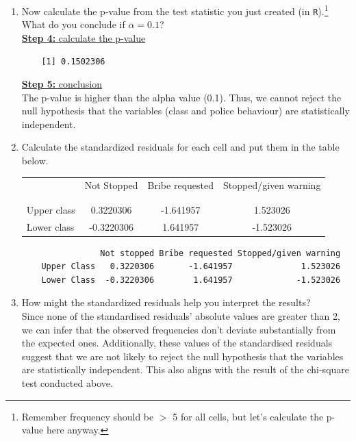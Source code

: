 \documentclass[12pt,letterpaper]{article}
\begin{document}
\begin{enumerate}
	\item [(b)]
	Now calculate the p-value from the test statistic you just created (in \texttt{R}).\footnote{Remember frequency should be $>$ 5 for all cells, but let's calculate the p-value here anyway.}  What do you conclude if $\alpha = 0.1$?\\ [0.3cm]
\underline{\textbf{Step 4:} calculate the p-value} 

\begin{verbatim}
	[1] 0.1502306
\end{verbatim}
\underline{\textbf{Step 5:} conclusion} \\ [0.5cm]
The p-value is higher than the alpha value (0.1). Thus, we cannot reject the null hypothesis that the variables (class and police behaviour) are statistically independent. \\ [0.3cm]
	\item [(c)] Calculate the standardized residuals for each cell and put them in the table below.
	\vspace{1cm}
	
	\begin{table}[h]
		\centering
		\begin{tabular}{l | c c c }
			& Not Stopped & Bribe requested & Stopped/given warning \\
			\\[-1.8ex] 
			\hline \\[-1.8ex]
			Upper class  &0.3220306   &-1.641957  &1.523026 \\
			Lower class  &-0.3220306  &1.641957   &-1.523026  \\
		\end{tabular}
	\end{table}
	
	\begin{verbatim}
	            Not stopped Bribe requested Stopped/given warning
	Upper Class   0.3220306       -1.641957              1.523026
	Lower Class  -0.3220306        1.641957             -1.523026
	\end{verbatim}
	\item [(d)] How might the standardized residuals help you interpret the results?  \\ [0.5cm]
	Since none of the standardised residuals’ absolute values are greater than 2, we can infer that the observed frequencies don’t deviate substantially from the expected ones. Additionally, these values of the standardised residuals suggest that we are not likely to reject the null hypothesis that the variables are statistically independent. This also aligns with the result of the chi-square test conducted above. 
\end{enumerate}
\newpage
\end{document}
